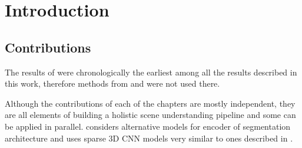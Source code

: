 \chapter{Introduction}









\section{Contributions}






The results of  were chronologically the earliest among all the results described in this work, therefore methods from  and  were not used there.

Although the contributions of each of the chapters are mostly independent, they are all elements of building a holistic scene understanding pipeline and some can be applied in parallel. 
 considers alternative models for encoder of segmentation architecture and uses sparse 3D CNN models very similar to ones described in .